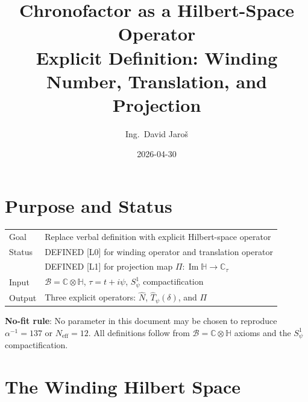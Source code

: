 \documentclass[12pt,a4paper]{article}
\title{\textbf{Chronofactor as a Hilbert-Space Operator}\\
         \large Explicit Definition: Winding Number, Translation, and Projection}
\author{Ing.\ David Jaro\v{s}}
\date{2026-04-30}
\theoremstyle{definition}
\theoremstyle{remark}
\begin{document}
  \maketitle
\fi

\section{Purpose and Status}
\label{sec:chron:purpose}

\begin{tcolorbox}[colback=blue!4!white, colframe=blue!50!black,
                  title=Chronofactor — Operator Formulation]
\begin{tabular}{ll}
Goal    & Replace verbal definition with explicit Hilbert-space operator \\
Status  & DEFINED [L0] for winding operator and translation operator \\
        & DEFINED [L1] for projection map $\Pi: \operatorname{Im}\mathbb{H}\to\mathbb{C}_\tau$ \\
Input   & $\mathcal{B}=\mathbb{C}\otimes\mathbb{H}$, $\tau=t+i\psi$, $S^1_\psi$ compactification \\
Output  & Three explicit operators: $\hat{N}$, $\hat{T}_\psi(\delta)$, and $\Pi$ \\
\end{tabular}
\end{tcolorbox}

\begin{warnbox}
\textbf{No-fit rule}: No parameter in this document may be chosen to reproduce
$\alpha^{-1} = 137$ or $N_{\mathrm{eff}} = 12$.  All definitions follow from
$\mathcal{B} = \mathbb{C}\otimes\mathbb{H}$ axioms and the $S^1_\psi$ compactification.
\end{warnbox}

\section{The Winding Hilbert Space}
\label{sec:chron:hilbert}
\end{document}
